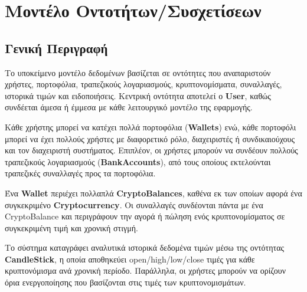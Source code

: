 \documentclass[a4paper,12pt]{article}
\begin{document}
\newpage

\section{Μοντέλο Οντοτήτων/Συσχετίσεων}

\subsection{Γενική Περιγραφή}
Το υποκείμενο μοντέλο δεδομένων βασίζεται σε οντότητες που αναπαριστούν χρήστες, πορτοφόλια,
τραπεζικούς λογαριασμούς, κρυπτονομίσματα, συναλλαγές, ιστορικά τιμών και ειδοποιήσεις. Κεντρική
οντότητα αποτελεί ο \textbf{User}, καθώς συνδέεται άμεσα 
ή έμμεσα με κάθε λειτουργικό μοντέλο της εφαρμογής.

Κάθε χρήστης μπορεί να κατέχει πολλά πορτοφόλια
(\textbf{Wallets}) ενώ, κάθε πορτοφόλι μπορεί να έχει πολλούς
χρήστες με διαφορετικό ρόλο, διαχειριστές ή συνδικαιούχους και τον διαχειριστή συστήματος. Επιπλέον, οι χρήστες μπορούν να
συνδέουν πολλούς τραπεζικούς λογαριασμούς (\textbf{BankAccounts}),
από τους οποίους εκτελούνται τραπεζικές συναλλαγές προς τα πορτοφόλια.

Ένα \textbf{Wallet} περιέχει πολλαπλά \textbf{CryptoBalances}, καθένα εκ των οποίων αφορά ένα
συγκεκριμένο \textbf{Cryptocurrency}. Οι συναλλαγές συνδέονται πάντα με ένα 
CryptoBalance και περιγράφουν την αγορά ή πώληση ενός κρυπτονομίσματος σε συγκεκριμένη τιμή και
χρονική στιγμή.

Το σύστημα καταγράφει αναλυτικά ιστορικά δεδομένα τιμών μέσω της οντότητας
\textbf{CandleStick}, η οποία αποθηκεύει open/high/low/close τιμές για κάθε κρυπτονόμισμα ανά
χρονική περίοδο. Παράλληλα, οι χρήστες μπορούν να ορίζουν όρια ενεργοποίησης
που βασίζονται στις τιμές των κρυπτονομισμάτων.
\end{document}
